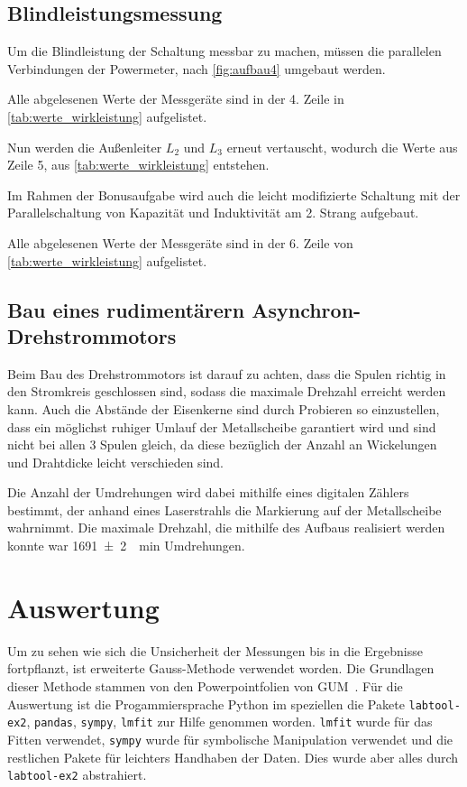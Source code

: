\documentclass[12pt,english,ngerman]{scrartcl}
\begin{document}
\subsection{Blindleistungsmessung}

Um die Blindleistung der Schaltung messbar zu machen, müssen die parallelen
Verbindungen der Powermeter, nach \autoref{fig:aufbau4} umgebaut werden.

Alle abgelesenen Werte der Messgeräte sind in der 4. Zeile in
\autoref{tab:werte_wirkleistung} aufgelistet.

Nun werden die Außenleiter $L_2$ und $L_3$ erneut vertauscht, wodurch die Werte
aus Zeile 5, aus \autoref{tab:werte_wirkleistung} entstehen.

Im Rahmen der Bonusaufgabe wird auch die leicht modifizierte Schaltung mit der
Parallelschaltung von Kapazität und Induktivität am 2. Strang aufgebaut.

Alle abgelesenen Werte der Messgeräte sind in der 6. Zeile von
\autoref{tab:werte_wirkleistung} aufgelistet.

\subsection{Bau eines rudimentärern Asynchron-Drehstrommotors}

Beim Bau des Drehstrommotors ist darauf zu achten, dass die Spulen richtig in
den Stromkreis geschlossen sind, sodass die maximale Drehzahl erreicht werden
kann. Auch die Abstände der Eisenkerne sind durch Probieren so einzustellen,
dass ein möglichst ruhiger Umlauf der Metallscheibe garantiert wird und sind
nicht bei allen 3 Spulen gleich, da diese bezüglich der Anzahl an Wickelungen
und Drahtdicke leicht verschieden sind.

Die Anzahl der Umdrehungen wird dabei mithilfe eines digitalen Zählers
bestimmt, der anhand eines Laserstrahls die Markierung auf der Metallscheibe
wahrnimmt. Die maximale Drehzahl, die mithilfe des Aufbaus realisiert werden
konnte war \SI{1691(2)}{\per\minute} Umdrehungen.

\section{Auswertung}\label{sec:auswertung}

Um zu sehen wie sich die Unsicherheit der Messungen bis in die Ergebnisse
fortpflanzt, ist erweiterte Gauss-Methode verwendet worden. Die Grundlagen
dieser Methode stammen von den Powerpointfolien von
GUM~\cite{wolfgang_kessel_isobipm-gum_2004}. Für die Auswertung ist die
Progammiersprache Python im speziellen die Pakete \verb#labtool-ex2#,
\verb#pandas#, \verb#sympy#, \verb#lmfit# zur Hilfe genommen worden.
\verb#lmfit# wurde für das Fitten verwendet, \verb#sympy# wurde für symbolische
Manipulation verwendet und die restlichen Pakete für leichters Handhaben der
Daten. Dies wurde aber alles durch \verb#labtool-ex2# abstrahiert.
\end{document}
